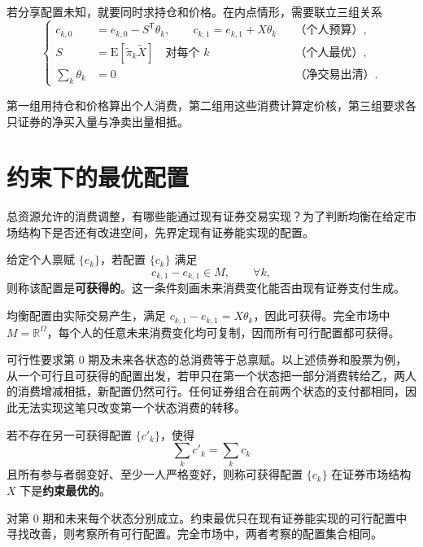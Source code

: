 若分享配置未知，就要同时求持仓和价格。在内点情形，需要联立三组关系
\[
 \left\{
 \begin{aligned}
 c_{k,0}&=e_{k,0}-S^{\mathsf T}\theta_k,\qquad
 c_{k,1}=e_{k,1}+X\theta_k
 &&\text{（个人预算）},\\
 S&=\mathrm E[\widetilde\pi_k\widetilde X]\quad\text{对每个 }k
 &&\text{（个人最优）},\\
 \sum_k\theta_k&=0
 &&\text{（净交易出清）}.
 \end{aligned}
 \right.
\]

第一组用持仓和价格算出个人消费，第二组用这些消费计算定价核，第三组要求各只证券的净买入量与净卖出量相抵。

\section{约束下的最优配置}\label{sec:wj-eleven-2}
总资源允许的消费调整，有哪些能通过现有证券交易实现？为了判断均衡在给定市场结构下是否还有改进空间，先界定现有证券能实现的配置。

\begin{tcolorbox}[knowledge]
 给定个人禀赋 $\{e_k\}$，若配置 $\{c_k\}$ 满足
\[
 c_{k,1}-e_{k,1}\in M,\qquad\forall k,
\]
则称该配置是\textbf{可获得的}。这一条件刻画未来消费变化能否由现有证券支付生成。
\end{tcolorbox}

均衡配置由实际交易产生，满足 $c_{k,1}-e_{k,1}=X\theta_k$，因此可获得。完全市场中 $M=\mathbb R^\Omega$，每个人的任意未来消费变化均可复制，因而所有可行配置都可获得。

可行性要求第 0 期及未来各状态的总消费等于总禀赋。以上述债券和股票为例，从一个可行且可获得的配置出发，若甲只在第一个状态把一部分消费转给乙，两人的消费增减相抵，新配置仍然可行。任何证券组合在前两个状态的支付都相同，因此无法实现这笔只改变第一个状态消费的转移。

\begin{tcolorbox}[knowledge]
 若不存在另一可获得配置 $\{c'_k\}$，使得
\begin{equation}
 \sum_k c'_k=\sum_k c_k
 \label{eq:wj-11-4}
\end{equation}
且所有参与者弱变好、至少一人严格变好，则称可获得配置 $\{c_k\}$ 在证券市场结构 $X$ 下是\textbf{约束最优的}。
\end{tcolorbox}

 对第 0 期和未来每个状态分别成立。约束最优只在现有证券能实现的可行配置中寻找改善，则考察所有可行配置。完全市场中，两者考察的配置集合相同。

